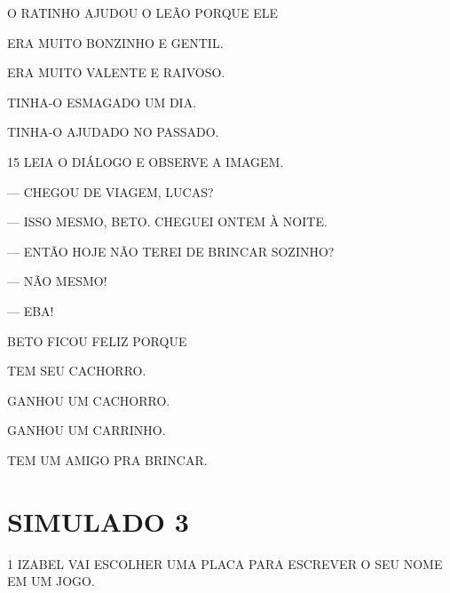 O RATINHO AJUDOU O LEÃO PORQUE ELE

\begin{escolha}
\item ERA MUITO BONZINHO E GENTIL.

\item ERA MUITO VALENTE E RAIVOSO.

\item TINHA-O ESMAGADO UM DIA.

\item TINHA-O AJUDADO NO PASSADO.
\end{escolha}

\num{15} LEIA O DIÁLOGO E OBSERVE A IMAGEM.



— CHEGOU DE VIAGEM, LUCAS?

— ISSO MESMO, BETO. CHEGUEI ONTEM À NOITE.

— ENTÃO HOJE NÃO TEREI DE BRINCAR SOZINHO?

— NÃO MESMO!

— EBA!

BETO FICOU FELIZ PORQUE

\begin{escolha}
\item TEM SEU CACHORRO.

\item GANHOU UM CACHORRO.

\item GANHOU UM CARRINHO.

\item TEM UM AMIGO PRA BRINCAR.
\end{escolha}


\chapter{SIMULADO 3}

\num{1} IZABEL VAI ESCOLHER UMA PLACA PARA ESCREVER O SEU NOME EM UM JOGO.


